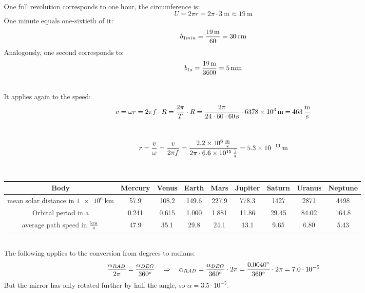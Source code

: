 \documentclass[a4paper]{article}
\begin{document}
	\\
	One full revolution corresponds to one hour, the circumference is:
	$$U=2\pi r = 2 \pi \cdot \SI{3}{\meter} \approx \SI{19}{\meter}$$
	One minute equals one-sixtieth of it:
	$$b_{1min} = {\SI{19}{\meter} \over 60}=\SI{30}{\centi\meter}$$
	Analogously, one second corresponds to:
	$$b_{1s}= {\SI{19}{\meter} \over 3600}=\SI{5}{\milli\meter}$$
	\vspace{0.5 cm}
	
	\\
	It applies again to the speed:
	$$v=\omega r = 2 \pi f \cdot R = {2 \pi \over T} \cdot R = {{}2\pi \over 24 \cdot 60 \cdot \SI{60}{\second}} \cdot \SI{6378e3}{\meter} = \SI{463}{\meter\over\second}$$
	\vspace{0.5 cm}
	
	\\
	$$r = {v \over \omega} ={v \over 2\pi f}= {\SI{2,2e6}{\meter\over\second} \over 2 \pi \cdot \SI{6, 6e15}{1\over\second}}= \SI{5,3e-11}{\meter}$$
	\vspace{0.5 cm}
	
	\\
	\renewcommand{\arraystretch}{2}
	\begin{tabular}{|c|c|c|c|c|c|c|c|c|}
		\hline
		Body & Mercury & Venus & Earth & Mars & Jupiter & Saturn & Uranus & Neptune \\
		\hline
		mean solar distance in $\SI{1e6}{\kilo\meter}$ & 57.9 & 108.2 & 149.6 & 227.9 & 778.3 & 1427 & 2871 & 4498\\
		\hline
		Orbital period in a & 0.241 & 0.615 & 1.000 & 1.881 &11.86 &29.45 & 84.02 & 164.8\\
		\hline
		average path speed in $\SI{}{\kilo\meter\over \second}$ & 47.9 & 35.1 & 29.8 & 24.1 & 13.1& 9.65 & 6.80 & 5.43 \\
		\hline
	\end{tabular}
	\vspace{0.5 cm}
	
	\\
	The following applies to the conversion from degrees to radians:
	$${\alpha _{RAD} \over 2\pi} = {\alpha _{DEG} \over \SI{360}{\degree}} \quad \Rightarrow \quad
	\alpha _{RAD}={\alpha _{DEG} \over \SI{360}{\degree}}\cdot 2\pi = {\SI{0.0040}{\degree} \over \SI{360}{ \degree}} \cdot 2 \pi = 7.0 \cdot 10^{-5}$$
	But the mirror has only rotated further by half the angle, so $\alpha= 3.5\cdot 10^{-5}$.
	\vspace{0.5 cm}
	
\end{document}
